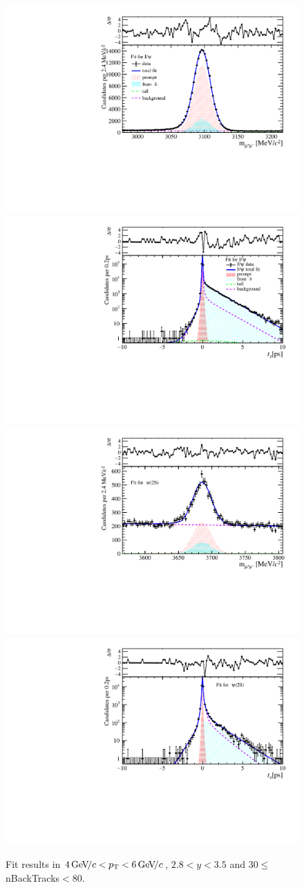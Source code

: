 \begin{figure}[H]
\begin{center}
\includegraphics[width=0.47\linewidth]{pdf/Jpsi/drawmassB/n5y2pt3.pdf}
\includegraphics[width=0.47\linewidth]{pdf/Jpsi/2DFitB/n5y2pt3.pdf}
\vspace*{-0.5cm}
\includegraphics[width=0.47\linewidth]{pdf/Psi2S/drawmassB/n5y2pt3.pdf}
\includegraphics[width=0.47\linewidth]{pdf/Psi2S/2DFitB/n5y2pt3.pdf}
\vspace*{-0.5cm}
\end{center}
\caption{Fit results in $4\text{\,Ge\kern -0.1em V\!/}c<p_{\mathrm{T}}<6\text{\,Ge\kern -0.1em V\!/}c$, $2.8<y<3.5$ and 30$\leq$nBackTracks$<$80.}
\label{Fitn5y2pt3}
\end{figure}
